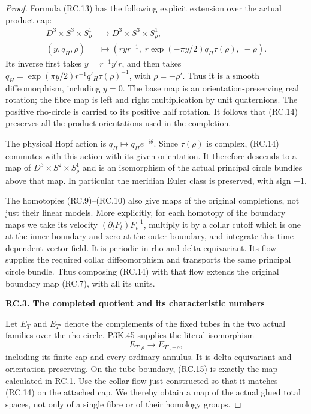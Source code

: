 \begin{proof}
Formula (RC.13) has the following explicit extension over the
actual product cap:
\[
 \begin{aligned}
 D^3\times S^3\times S^1_\rho&\longrightarrow
                  D^3\times S^3\times S^1_\rho,\\
 (y,q_H,\rho)&\longmapsto
 \left(ryr^{-1},\;r\exp(-\pi y/2)q_H\tau(\rho),\;-\rho\right).
 \end{aligned}                                               \tag{RC.14}
\]
Its inverse first takes \(y=r^{-1}y'r\), and then takes
\(q_H=\exp(\pi y/2)r^{-1}q'_H\tau(\rho)^{-1}\), with
\(\rho=-\rho'\). Thus it is a smooth diffeomorphism, including
\(y=0\). The base map is an orientation-preserving real rotation;
the fibre map is left and right multiplication by unit quaternions.
The positive rho-circle is carried to its positive half rotation.
It follows that (RC.14) preserves all the product orientations used
in the completion.

The physical Hopf action is \(q_H\mapsto q_He^{-i\theta}\).
Since \(\tau(\rho)\) is complex, (RC.14) commutes with this action
with its given orientation. It therefore descends to a map of
\(D^3\times S^2\times S^1_\rho\) and is an isomorphism of the
actual principal circle bundles above that map. In particular the
meridian Euler class is preserved, with sign \(+1\).

The homotopies (RC.9)--(RC.10) also give maps of the original
completions, not just their linear models. More explicitly, for each
homotopy of the boundary maps we take its velocity
\((\partial_tF_t)F_t^{-1}\), multiply it by a collar cutoff which is
one at the inner boundary and zero at the outer boundary, and
integrate this time-dependent vector field. It is periodic in rho
and delta-equivariant. Its flow supplies the required collar
diffeomorphism and transports the same principal circle bundle.
Thus composing (RC.14) with that flow extends the original boundary
map (RC.7), with all its units.

\par

\medskip\noindent\textbf{RC.3. The completed quotient and its characteristic numbers}

\par\nobreak

Let \(E_T\) and \(E_{T'}\) denote the complements of the fixed tubes
in the two actual families over the rho-circle. P3K.45 supplies the
literal isomorphism
\[
       E_{T,\rho}\longrightarrow E_{T',-\rho},       \tag{RC.15}
\]
including its finite cap and every ordinary annulus. It is
delta-equivariant and orientation-preserving. On the tube boundary,
(RC.15) is exactly the map calculated in RC.1. Use the collar flow
just constructed so that it matches (RC.14) on the attached cap.
We thereby obtain a map of the actual glued total spaces, not only
of a single fibre or of their homology groups.


\end{proof}
